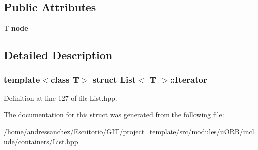 \subsection*{Public Attributes}
\begin{DoxyCompactItemize}
\item 
\mbox{\label{structList_1_1Iterator_acc7d2bcd20a47511a10b7c0cca3bc844}} 
T {\bfseries node}
\end{DoxyCompactItemize}


\subsection{Detailed Description}
\subsubsection*{template$<$class T$>$\newline
struct List$<$ T $>$\+::\+Iterator}



Definition at line 127 of file List.\+hpp.



The documentation for this struct was generated from the following file\+:\begin{DoxyCompactItemize}
\item 
/home/andressanchez/\+Escritorio/\+G\+I\+T/project\+\_\+template/src/modules/u\+O\+R\+B/include/containers/\hyperlink{List_8hpp}{List.\+hpp}\end{DoxyCompactItemize}
